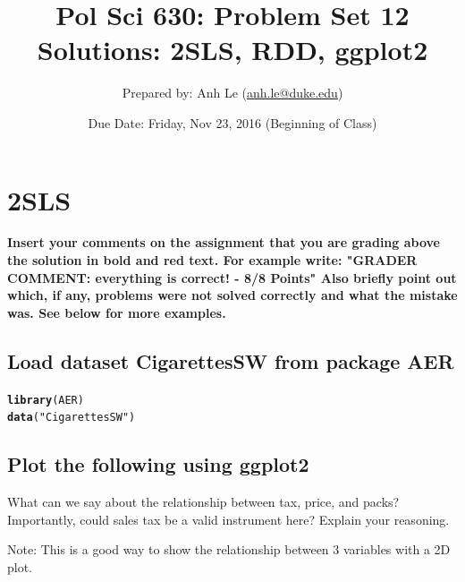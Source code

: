 \documentclass{article}\usepackage[]{graphicx}\usepackage[]{color}
\makeatletter
\newcommand{\hlstr}[1]{\textcolor[rgb]{0.192,0.494,0.8}{#1}}%
\newcommand{\hlstd}[1]{\textcolor[rgb]{0.345,0.345,0.345}{#1}}%
\newcommand{\hlkwd}[1]{\textcolor[rgb]{0.737,0.353,0.396}{\textbf{#1}}}%
\newenvironment{kframe}{%
 \def\at@end@of@kframe{}%
 \ifinner\ifhmode%
  \def\at@end@of@kframe{\end{minipage}}%
  \begin{minipage}{\columnwidth}%
 \fi\fi%
 \def\FrameCommand##1{\hskip\@totalleftmargin \hskip-\fboxsep
 \colorbox{shadecolor}{##1}\hskip-\fboxsep
     \hskip-\linewidth \hskip-\@totalleftmargin \hskip\columnwidth}%
 \MakeFramed {\advance\hsize-\width
   \@totalleftmargin\z@ \linewidth\hsize
   \@setminipage}}%
 {\par\unskip\endMakeFramed%
 \at@end@of@kframe}
\newenvironment{knitrout}{}{} %
\makeatother
\begin{document}
\title{Pol Sci 630:  Problem Set 12 Solutions: 2SLS, RDD, ggplot2}

\author{Prepared by: Anh Le (\href{mailto:anh.le@duke.edu}{anh.le@duke.edu})}

\date{Due Date: Friday, Nov 23, 2016 (Beginning of Class)}

\maketitle

\section{2SLS}

\textbf{\color{red} Insert your comments on the assignment that you are grading above the solution in bold and red text. For example write: "GRADER COMMENT: everything is correct! - 8/8 Points" Also briefly point out which, if any, problems were not solved correctly and what the mistake was. See below for more examples.}

\subsection{Load dataset CigarettesSW from package AER}

\begin{knitrout}
\color{fgcolor}\begin{kframe}
\begin{alltt}
\hlkwd{library}\hlstd{(AER)}
\hlkwd{data}\hlstd{(}\hlstr{"CigarettesSW"}\hlstd{)}
\end{alltt}
\end{kframe}
\end{knitrout}

\subsection{Plot the following using ggplot2}

What can we say about the relationship between tax, price, and packs? Importantly, could sales tax be a valid instrument here? Explain your reasoning.

Note: This is a good way to show the relationship between 3 variables with a 2D plot.
\end{document}
